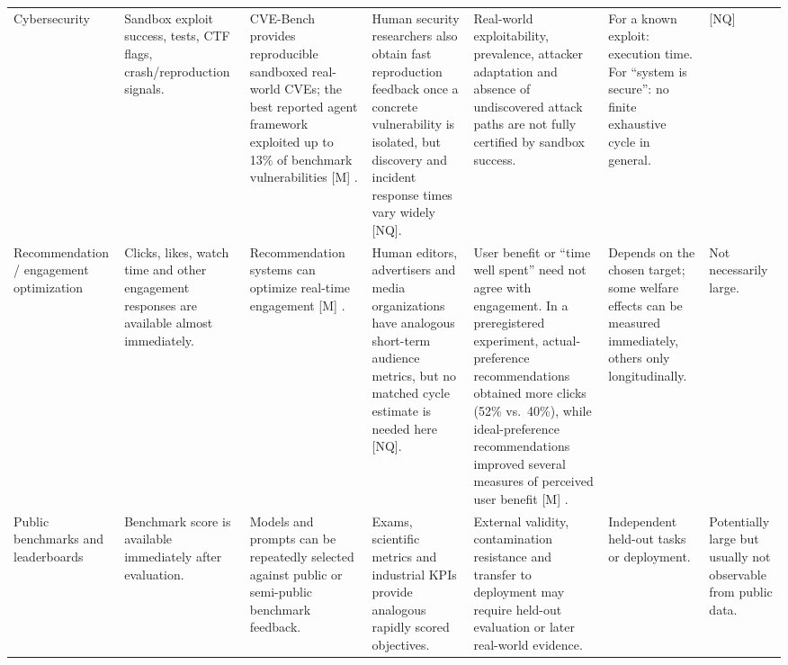 \begin{landscape}
\begin{center}
\begin{longtable}{
    @{}
    p{2.0cm}
    p{3.0cm}
    p{2.85cm}
    p{2.75cm}
    p{3.05cm}
    p{2.75cm}
    p{2.55cm}
    @{}
}
\\[3pt]

Cybersecurity
&
Sandbox exploit success, tests, CTF flags, crash/reproduction signals.
&
CVE-Bench provides reproducible sandboxed real-world CVEs; the best
reported agent framework exploited up to 13\% of benchmark
vulnerabilities [M] \parencite{zhu2025cvebench}.
&
Human security researchers also obtain fast reproduction feedback once
a concrete vulnerability is isolated, but discovery and incident
response times vary widely [NQ].
&
Real-world exploitability, prevalence, attacker adaptation and absence
of undiscovered attack paths are not fully certified by sandbox success.
&
For a known exploit: execution time.  For ``system is secure'': no
finite exhaustive cycle in general.
&
[NQ]

\\[3pt]

Recommendation / engagement optimization
&
Clicks, likes, watch time and other engagement responses are available
almost immediately.
&
Recommendation systems can optimize real-time engagement [M]
\parencite{khambatta2023ideal}.
&
Human editors, advertisers and media organizations have analogous
short-term audience metrics, but no matched cycle estimate is needed
here [NQ].
&
User benefit or ``time well spent'' need not agree with engagement.  In
a preregistered experiment, actual-preference recommendations obtained
more clicks (52\% vs.\ 40\%), while ideal-preference recommendations
improved several measures of perceived user benefit [M]
\parencite{khambatta2023ideal}.
&
Depends on the chosen target; some welfare effects can be measured
immediately, others only longitudinally.
&
Not necessarily large.

\\[3pt]

Public benchmarks and leaderboards
&
Benchmark score is available immediately after evaluation.
&
Models and prompts can be repeatedly selected against public or
semi-public benchmark feedback.
&
Exams, scientific metrics and industrial KPIs provide analogous
rapidly scored objectives.
&
External validity, contamination resistance and transfer to deployment
may require held-out evaluation or later real-world evidence.
&
Independent held-out tasks or deployment.
&
Potentially large but usually not observable from public data.

\\[3pt]


\end{longtable}
\end{center}
\end{landscape}
